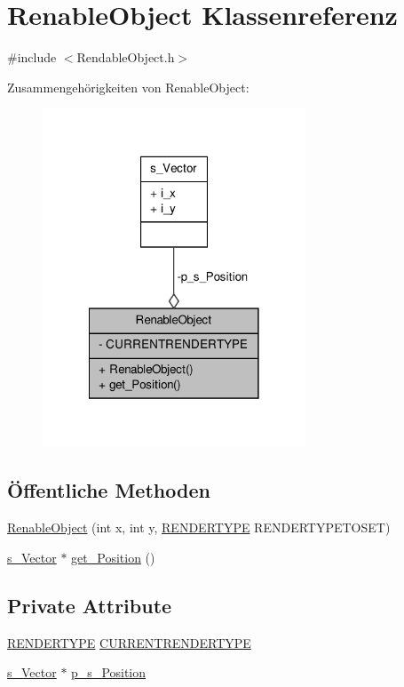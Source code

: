 \hypertarget{class_renable_object}{\section{Renable\-Object Klassenreferenz}
\label{class_renable_object}
}


{\ttfamily \#include $<$Rendable\-Object.\-h$>$}



Zusammengehörigkeiten von Renable\-Object\-:
\nopagebreak
\begin{figure}[H]
\begin{center}
\leavevmode
\includegraphics[width=222pt]{class_renable_object__coll__graph}
\end{center}
\end{figure}
\subsection*{Öffentliche Methoden}
\begin{DoxyCompactItemize}
\item 
\hyperlink{class_renable_object_a19c91f8028fcebc338bc0d0bbbe34951}{Renable\-Object} (int x, int y, \hyperlink{globals_8h_a9f730d58f3c4c4c2b09d39fa60004abd}{R\-E\-N\-D\-E\-R\-T\-Y\-P\-E} R\-E\-N\-D\-E\-R\-T\-Y\-P\-E\-T\-O\-S\-E\-T)
\item 
\hyperlink{structs___vector}{s\-\_\-\-Vector} $\ast$ \hyperlink{class_renable_object_a31ee1f9fc1039eafa145fcac80685068}{get\-\_\-\-Position} ()
\end{DoxyCompactItemize}
\subsection*{Private Attribute}
\begin{DoxyCompactItemize}
\item 
\hyperlink{globals_8h_a9f730d58f3c4c4c2b09d39fa60004abd}{R\-E\-N\-D\-E\-R\-T\-Y\-P\-E} \hyperlink{class_renable_object_ac47152b0849e69f97e9771d0562112f1}{C\-U\-R\-R\-E\-N\-T\-R\-E\-N\-D\-E\-R\-T\-Y\-P\-E}
\item 
\hyperlink{structs___vector}{s\-\_\-\-Vector} $\ast$ \hyperlink{class_renable_object_aecde2f6ac264d9cbcf8f63da9a91f1af}{p\-\_\-s\-\_\-\-Position}
\end{DoxyCompactItemize}


